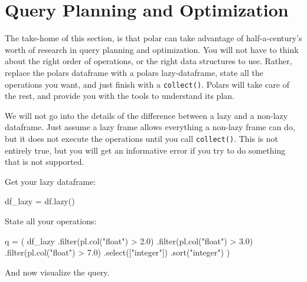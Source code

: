 \documentclass[
  letterpaper,
  DIV=11,
  numbers=noendperiod]{scrartcl}
\newenvironment{Shaded}{\begin{snugshade}}{\end{snugshade}}
\newcommand{\BuiltInTok}[1]{\textcolor[rgb]{0.00,0.23,0.31}{#1}}
\newcommand{\FloatTok}[1]{\textcolor[rgb]{0.68,0.00,0.00}{#1}}
\newcommand{\NormalTok}[1]{\textcolor[rgb]{0.00,0.23,0.31}{#1}}
\newcommand{\OperatorTok}[1]{\textcolor[rgb]{0.37,0.37,0.37}{#1}}
\newcommand{\StringTok}[1]{\textcolor[rgb]{0.13,0.47,0.30}{#1}}
\begin{document}
\hypertarget{sec-query-planning}{%
\section{Query Planning and Optimization}\label{sec-query-planning}}

The take-home of this section, is that polar can take advantage of
half-a-century's worth of research in query planning and optimization.
You will not have to think about the right order of operations, or the
right data structures to use. Rather, replace the polars dataframe with
a polars lazy-dataframe, state all the operations you want, and just
finish with a \texttt{collect()}. Polars will take care of the rest, and
provide you with the tools to understand its plan.

We will not go into the details of the difference between a lazy and a
non-lazy dataframe. Just assume a lazy frame allows everything a
non-lazy frame can do, but it does not execute the operations until you
call \texttt{collect()}. This is not entirely true, but you will get an
informative error if you try to do something that is not supported.

Get your lazy dataframe:

\begin{Shaded}
\begin{Highlighting}[]
\NormalTok{df\_lazy }\OperatorTok{=}\NormalTok{ df.lazy()}
\end{Highlighting}
\end{Shaded}

State all your operations:

\begin{Shaded}
\begin{Highlighting}[]
\NormalTok{q }\OperatorTok{=}\NormalTok{ (}
\NormalTok{  df\_lazy}
\NormalTok{  .}\BuiltInTok{filter}\NormalTok{(pl.col(}\StringTok{"float"}\NormalTok{) }\OperatorTok{\textgreater{}} \FloatTok{2.0}\NormalTok{)}
\NormalTok{  .}\BuiltInTok{filter}\NormalTok{(pl.col(}\StringTok{"float"}\NormalTok{) }\OperatorTok{\textgreater{}} \FloatTok{3.0}\NormalTok{)}
\NormalTok{  .}\BuiltInTok{filter}\NormalTok{(pl.col(}\StringTok{"float"}\NormalTok{) }\OperatorTok{\textgreater{}} \FloatTok{7.0}\NormalTok{)}
\NormalTok{  .select([}\StringTok{"integer"}\NormalTok{])}
\NormalTok{  .sort(}\StringTok{"integer"}\NormalTok{)}
\NormalTok{)}
\end{Highlighting}
\end{Shaded}

And now visualize the query.
\end{document}
